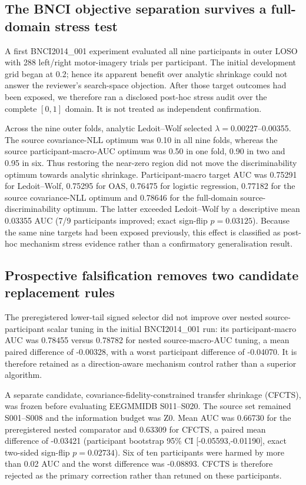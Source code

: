 \subsection{The BNCI objective separation survives a full-domain stress test}
A first BNCI2014\_001 experiment evaluated all nine participants in outer
LOSO with 288 left/right motor-imagery trials per participant. The initial
development grid began at 0.2; hence its apparent benefit over analytic
shrinkage could not answer the reviewer's search-space objection. After those
target outcomes had been exposed, we therefore ran a disclosed post-hoc
stress audit over the complete \([0,1]\) domain. It is not treated as
independent confirmation.

Across the nine outer folds, analytic Ledoit--Wolf selected
\(\lambda=0.00227\)--0.00355. The source covariance-NLL optimum was 0.10 in
all nine folds, whereas the source participant-macro-AUC optimum was 0.50 in
one fold, 0.90 in two and 0.95 in six. Thus restoring the near-zero region did
not move the discriminability optimum towards analytic shrinkage.
Participant-macro target AUC was 0.75291 for Ledoit--Wolf, 0.75295 for OAS,
0.76475 for logistic regression, 0.77182 for the source covariance-NLL
optimum and 0.78646 for the full-domain source-discriminability optimum.
The latter exceeded Ledoit--Wolf by a descriptive mean 0.03355 AUC (7/9
participants improved; exact sign-flip \(p=0.03125\)). Because the same nine
targets had been exposed previously, this effect is classified as post-hoc
mechanism stress evidence rather than a confirmatory generalisation result.

\subsection{Prospective falsification removes two candidate replacement rules}
The preregistered lower-tail signed selector did not improve over nested
source-participant scalar tuning in the initial BNCI2014\_001 run: its
participant-macro AUC was 0.78455 versus 0.78782 for nested source-macro-AUC
tuning, a mean paired difference of -0.00328, with a worst participant
difference of -0.04070. It is therefore retained as a direction-aware
mechanism control rather than a superior algorithm.

A separate candidate, covariance-fidelity-constrained transfer shrinkage
(CFCTS), was frozen before evaluating EEGMMIDB S011--S020. The source set
remained S001--S008 and the information budget was Z0. Mean AUC was 0.66730
for the preregistered nested comparator and 0.63309 for CFCTS, a paired mean
difference of -0.03421 (participant bootstrap 95\% CI
[-0.05593,-0.01190], exact two-sided sign-flip \(p=0.02734\)). Six of ten
participants were harmed by more than 0.02 AUC and the worst difference was
-0.08893. CFCTS is therefore rejected as the primary correction rather than
retuned on these participants.

